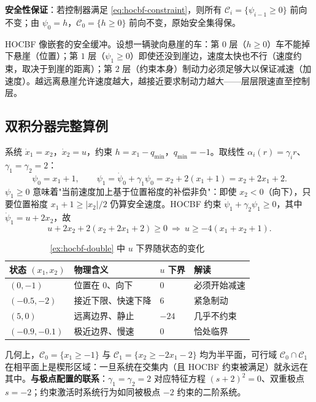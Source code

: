 \textbf{安全性保证}：若控制器满足 \cref{eq:hocbf-constraint}，则所有 $\mathcal C_i=\{\psi_{i-1}\ge0\}$ 前向不变；由 $\psi_0=h$，$\mathcal C_0=\{h\ge0\}$ 前向不变，原始安全集得保。

\begin{insight}[嵌套的安全缓冲区]
HOCBF 像嵌套的安全缓冲。设想一辆驶向悬崖的车：第 $0$ 层（$h\ge0$）车不能掉下悬崖（位置）；第 $1$ 层（$\psi_1\ge0$）即使还没到崖边，速度太快也不行（速度约束，取决于到崖的距离）；第 $2$ 层（约束本身）制动力必须足够大以保证减速（加速度）。越远离悬崖允许速度越大，越接近要求制动力越大——层层限速直至控制层。
\end{insight}

\subsection{双积分器完整算例}

\begin{example}\label{ex:hocbf-double}
系统 $\dot x_1=x_2$，$\dot x_2=u$，约束 $h=x_1-q_{\min}$，$q_{\min}=-1$。取线性 $\alpha_i(r)=\gamma_i r$、$\gamma_1=\gamma_2=2$：
\[
\psi_0=x_1+1,\qquad \psi_1=\dot\psi_0+\gamma_1\psi_0=x_2+2(x_1+1)=x_2+2x_1+2.
\]
$\psi_1\ge0$ 意味着"当前速度加上基于位置裕度的补偿非负"：即使 $x_2<0$（向下），只要位置裕度 $x_1+1\ge|x_2|/2$ 仍算安全速度。HOCBF 约束 $\dot\psi_1+\gamma_2\psi_1\ge0$，其中 $\dot\psi_1=u+2x_2$，故
\[
u+2x_2+2(x_2+2x_1+2)\ge0\ \Longrightarrow\ u\ge-4(x_1+x_2+1).
\]
\end{example}

\begin{table}[H]\centering\small
\caption{\cref{ex:hocbf-double} 中 $u$ 下界随状态的变化}
\label{tab:hocbf-numerical}
\begin{tabular}{llll}
\toprule
状态 $(x_1,x_2)$ & 物理含义 & $u$ 下界 & 解读 \\
\midrule
$(0,-1)$ & 位置在 $0$、向下 & $0$ & 必须开始减速 \\
$(-0.5,-2)$ & 接近下限、快速下降 & $6$ & 紧急制动 \\
$(5,0)$ & 远离边界、静止 & $-24$ & 几乎不约束 \\
$(-0.9,-0.1)$ & 极近边界、慢速 & $0$ & 恰处临界 \\
\bottomrule
\end{tabular}
\end{table}

几何上，$\mathcal C_0=\{x_1\ge-1\}$ 与 $\mathcal C_1=\{x_2\ge-2x_1-2\}$ 均为半平面，可行域 $\mathcal C_0\cap\mathcal C_1$ 在相平面上是楔形区域：一旦系统在交集内（且 HOCBF 约束被满足）就永远在其中。\textbf{与极点配置的联系}：$\gamma_1=\gamma_2=2$ 对应特征方程 $(s+2)^2=0$、双重极点 $s=-2$；约束激活时系统行为如同被极点 $-2$ 约束的二阶系统。

